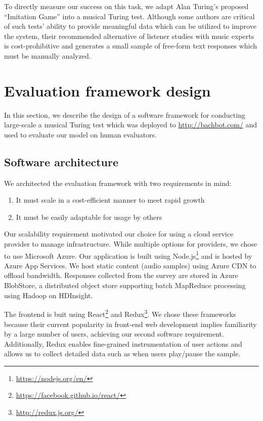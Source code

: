 To directly measure our success on this task, we adapt Alan Turing's proposed
``Imitation Game'' \citep{turing1950computing} into a musical Turing test.
Although some authors \citep{ariza2009interrogator} are critical of such tests'
ability to provide meaningful data which can be utilized to improve the system,
their recommended alternative of listener studies with music experts is
cost-prohibitive and generates a small sample of free-form text responses which
must be manually analyzed.

\section{Evaluation framework design}

In this section, we describe the design of a software framework for conducting
large-scale a musical Turing test which was deployed to \url{http://bachbot.com/}
and used to evaluate our model on human evaluators.

\subsection{Software architecture}

We architected the evaluation framework with two requirements in mind:
\begin{enumerate}
  \item It must scale in a cost-efficient manner to meet rapid growth
  \item It must be easily adaptable for usage by others
\end{enumerate}

Our scalability requirement motivated our choice for using a cloud service
provider to manage infrastructure. While multiple options for providers, we
chose to use Microsoft Azure. Our application is built using
Node.js\footnote{\url{https://nodejs.org/en/}} and is hosted by Azure App
Services. We host static content (\eg audio samples) using Azure CDN to offload
bandwidth. Responses collected from the survey are stored in Azure BlobStore, a
distributed object store supporting batch MapReduce processing using Hadoop on
HDInsight.

The frontend is buit using
React\footnote{\url{https://facebook.github.io/react/}} and
Redux\footnote{\url{http://redux.js.org/}}. We chose these frameworks because
their current popularity in front-end web development implies familiarity by a
large number of users, achieving our second software requirement. Additionally,
Redux enables fine-grained instrumentation of user actions and allows us to
collect detailed data such as when users play/pause the sample.

